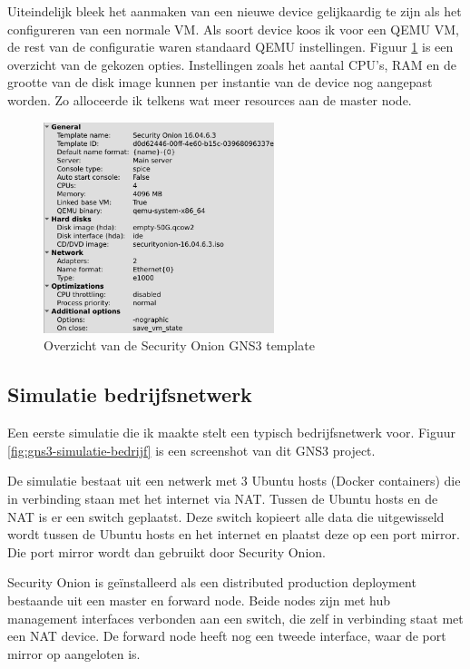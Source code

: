 \documentclass[a4paper, 12pt]{report}
\begin{document}
Uiteindelijk bleek het aanmaken van een nieuwe device gelijkaardig te zijn als het configureren van een normale VM.
Als soort device koos ik voor een QEMU VM, de rest van de configuratie waren standaard QEMU instellingen.
Figuur \ref{fig:gns3-so-appliance} is een overzicht van de gekozen opties.
Instellingen zoals het aantal CPU's, RAM en de grootte van de disk image kunnen per instantie van de device nog aangepast worden.
Zo alloceerde ik telkens wat meer resources aan de master node.

\begin{figure}[H]
  \centering
  \includegraphics[width=0.6\textwidth]{gns3-so-appliance}
  \caption{Overzicht van de Security Onion GNS3 template}
  \label{fig:gns3-so-appliance}
\end{figure}

\subsection{Simulatie bedrijfsnetwerk}

Een eerste simulatie die ik maakte stelt een typisch bedrijfsnetwerk voor.
Figuur \ref{fig:gns3-simulatie-bedrijf} is een screenshot van dit GNS3 project.

De simulatie bestaat uit een netwerk met 3 Ubuntu hosts (Docker containers) die in verbinding staan met het internet via NAT.
Tussen de Ubuntu hosts en de NAT is er een switch geplaatst.
Deze switch kopieert alle data die uitgewisseld wordt tussen de Ubuntu hosts en het internet en plaatst deze op een port mirror.
Die port mirror wordt dan gebruikt door Security Onion.

Security Onion is geïnstalleerd als een distributed production deployment bestaande uit een master en forward node. 
Beide nodes zijn met hub management interfaces verbonden aan een switch, die zelf in verbinding staat met een NAT device.
De forward node heeft nog een tweede interface, waar de port mirror op aangeloten is.
\end{document}
